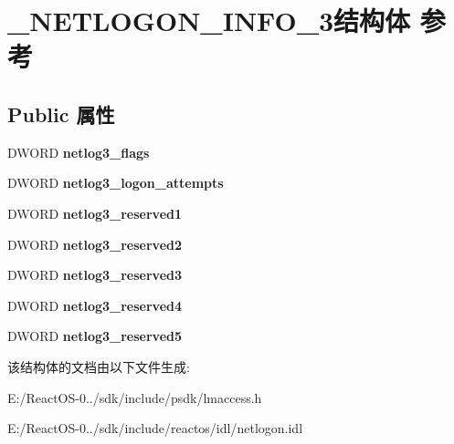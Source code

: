 \hypertarget{struct___n_e_t_l_o_g_o_n___i_n_f_o__3}{}\section{\+\_\+\+N\+E\+T\+L\+O\+G\+O\+N\+\_\+\+I\+N\+F\+O\+\_\+3结构体 参考}
\label{struct___n_e_t_l_o_g_o_n___i_n_f_o__3}
\subsection*{Public 属性}
\begin{DoxyCompactItemize}
\item 
\mbox{\label{struct___n_e_t_l_o_g_o_n___i_n_f_o__3_a1d568dcafa9da11a8f98cc761f784b16}} 
D\+W\+O\+RD {\bfseries netlog3\+\_\+flags}
\item 
\mbox{\label{struct___n_e_t_l_o_g_o_n___i_n_f_o__3_a5f491ffee904f0085ea0e1647b929a31}} 
D\+W\+O\+RD {\bfseries netlog3\+\_\+logon\+\_\+attempts}
\item 
\mbox{\label{struct___n_e_t_l_o_g_o_n___i_n_f_o__3_a9358d2f2913b86c5d89f6a1265096f05}} 
D\+W\+O\+RD {\bfseries netlog3\+\_\+reserved1}
\item 
\mbox{\label{struct___n_e_t_l_o_g_o_n___i_n_f_o__3_a0dbc830546ed75eb9a8cd3a6fce28d22}} 
D\+W\+O\+RD {\bfseries netlog3\+\_\+reserved2}
\item 
\mbox{\label{struct___n_e_t_l_o_g_o_n___i_n_f_o__3_a3650ebdb14e2a50ef08aa7ef2c90e8d0}} 
D\+W\+O\+RD {\bfseries netlog3\+\_\+reserved3}
\item 
\mbox{\label{struct___n_e_t_l_o_g_o_n___i_n_f_o__3_adb9d5805b06c13e7248dfe7c8c4f1b11}} 
D\+W\+O\+RD {\bfseries netlog3\+\_\+reserved4}
\item 
\mbox{\label{struct___n_e_t_l_o_g_o_n___i_n_f_o__3_a3cffa137587df3cf2e609b43f4a4cf65}} 
D\+W\+O\+RD {\bfseries netlog3\+\_\+reserved5}
\end{DoxyCompactItemize}


该结构体的文档由以下文件生成\+:\begin{DoxyCompactItemize}
\item 
E\+:/\+React\+O\+S-\/0../sdk/include/psdk/lmaccess.\+h\item 
E\+:/\+React\+O\+S-\/0../sdk/include/reactos/idl/netlogon.\+idl\end{DoxyCompactItemize}
